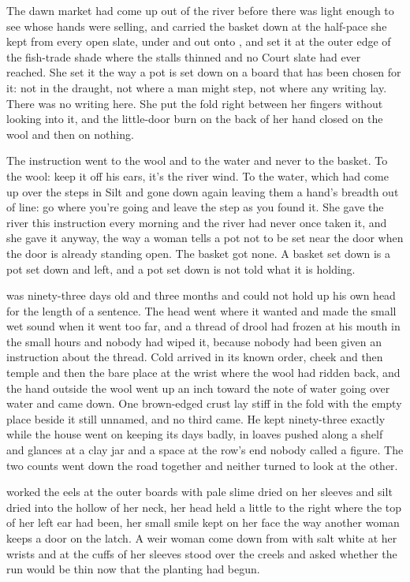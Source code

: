 
The dawn market had come up out of the river before there was light enough to see whose hands were selling, and  carried the basket down at the half-pace she kept from every open slate, under  and out onto , and set it at the outer edge of the fish-trade shade where the stalls thinned and no Court slate had ever reached. She set it the way a pot is set down on a board that has been chosen for it: not in the draught, not where a man might step, not where any writing lay. There was no writing here. She put the fold right between her fingers without looking into it, and the little-door burn on the back of her hand closed on the wool and then on nothing.

The instruction went to the wool and to the water and never to the basket. To the wool: keep it off his ears, it's the river wind. To the water, which had come up over the steps in Silt and gone down again leaving them a hand's breadth out of line: go where you're going and leave the step as you found it. She gave the river this instruction every morning and the river had never once taken it, and she gave it anyway, the way a woman tells a pot not to be set near the door when the door is already standing open. The basket got none. A basket set down is a pot set down and left, and a pot set down is not told what it is holding.

 was ninety-three days old and three months and could not hold up his own head for the length of a sentence. The head went where it wanted and made the small wet sound when it went too far, and a thread of drool had frozen at his mouth in the small hours and nobody had wiped it, because nobody had been given an instruction about the thread. Cold arrived in its known order, cheek and then temple and then the bare place at the wrist where the wool had ridden back, and the hand outside the wool went up an inch toward the note of water going over water and came down. One brown-edged crust lay stiff in the fold with the empty place beside it still unnamed, and no third came. He kept ninety-three exactly while the house went on keeping its days badly, in loaves pushed along a shelf and glances at a clay jar and a space at the row's end nobody called a figure. The two counts went down the road together and neither turned to look at the other.

 worked the eels at the outer boards with pale slime dried on her sleeves and silt dried into the hollow of her neck, her head held a little to the right where the top of her left ear had been, her small smile kept on her face the way another woman keeps a door on the latch. A weir woman come down from  with salt white at her wrists and at the cuffs of her sleeves stood over the creels and asked whether the run would be thin now that the planting had begun.


